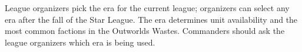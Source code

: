 League organizers pick the era for the current league; organizers can select any era after the fall of the Star League.
The era determines unit availability and the most common factions in the Outworlds Wastes.
Commanders should ask the league organizers which era is being used.
